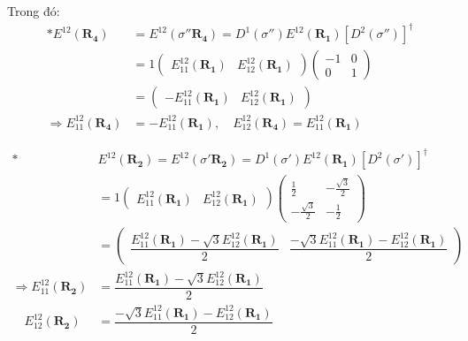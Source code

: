\documentclass{report}
\begin{document}
Trong đó:
\begin{align*}
	\ast E^{12}(\mathbf{R_4})             & = E^{12}(\sigma''\mathbf{R_4}) = D^1(\sigma'') E^{12}(\mathbf{R_1}) \left[D^2(\sigma'')\right]^\dagger \\
	                                      & = 1
	\begin{pmatrix}
		E_{11}^{12}(\mathbf{R_1}) & E_{12}^{12}(\mathbf{R_1})
	\end{pmatrix}
	\begin{pmatrix}
		-1 & 0 \\
		0  & 1
	\end{pmatrix}                                                                                                                                 \\
	                                      & =
	\begin{pmatrix}
		- E_{11}^{12}(\mathbf{R_1}) & E_{12}^{12}(\mathbf{R_1})
	\end{pmatrix}                                                                                        \\
	\Rightarrow E_{11}^{12}(\mathbf{R_4}) & = - E_{11}^{12}(\mathbf{R_1}) , \quad E_{12}^{12}(\mathbf{R_4}) = E_{11}^{12}(\mathbf{R_1})
\end{align*}

\begin{align*}
	\ast                                  & E^{12}(\mathbf{R_2})             = E^{12}(\sigma'\mathbf{R_2}) = D^1(\sigma') E^{12}(\mathbf{R_1}) \left[D^2(\sigma')\right]^\dagger \\
	                                      & = 1
	\begin{pmatrix}
		E_{11}^{12}(\mathbf{R_1}) & E_{12}^{12}(\mathbf{R_1})
	\end{pmatrix}
	\begin{pmatrix}
		\frac{1}{2}         & -\frac{\sqrt{3}}{2} \\
		-\frac{\sqrt{3}}{2} & -\frac{1}{2}
	\end{pmatrix}                                                                                                                     \\
	                                      & =
	\begin{pmatrix}
		\dfrac{E_{11}^{12}(\mathbf{R_1}) - \sqrt{3}E_{12}^{12}(\mathbf{R_1})}{2} & \dfrac{ -\sqrt{3}E_{11}^{12}(\mathbf{R_1}) - E_{12}^{12}(\mathbf{R_1})}{2}
	\end{pmatrix}                        \\
	\Rightarrow E_{11}^{12}(\mathbf{R_2}) & = \dfrac{E_{11}^{12}(\mathbf{R_1}) - \sqrt{3}E_{12}^{12}(\mathbf{R_1})}{2}                                                           \\
	\quad E_{12}^{12}(\mathbf{R_2})       & = \dfrac{ -\sqrt{3}E_{11}^{12}(\mathbf{R_1}) - E_{12}^{12}(\mathbf{R_1})}{2}
\end{align*}
\end{document}
